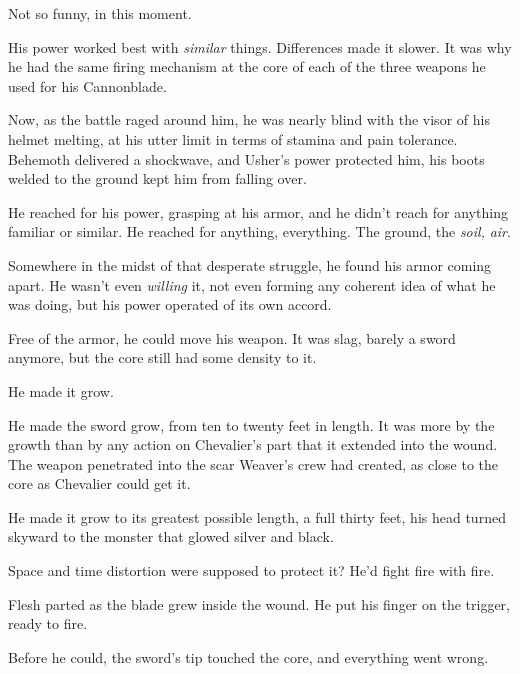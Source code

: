 Not so funny, in this moment.



His power worked best with \emph{similar} things.  Differences made it slower.  It was why he had the same firing mechanism at the core of each of the three weapons he used for his Cannonblade.



Now, as the battle raged around him, he was nearly blind with the visor of his helmet melting, at his utter limit in terms of stamina and pain tolerance.  Behemoth delivered a shockwave, and Usher's power protected him, his boots welded to the ground kept him from falling over.



He reached for his power, grasping at his armor, and he didn't reach for anything familiar or similar.  He reached for anything, everything.  The ground, the \emph{soil, }\emph{air}.



Somewhere in the midst of that desperate struggle, he found his armor coming apart.  He wasn't even \emph{willing} it, not even forming any coherent idea of what he was doing, but his power operated of its own accord.



Free of the armor, he could move his weapon.  It was slag, barely a sword anymore, but the core still had some density to it.



He made it grow.



He made the sword grow, from ten to twenty feet in length.  It was more by the growth than by any action on Chevalier's part that it extended into the wound.  The weapon penetrated into the scar Weaver's crew had created, as close to the core as Chevalier could get it.



He made it grow to its greatest possible length, a full thirty feet, his head turned skyward to the monster that glowed silver and black.



Space and time distortion were supposed to protect it?  He'd fight fire with fire.



Flesh parted as the blade grew inside the wound.  He put his finger on the trigger, ready to fire.



Before he could, the sword's tip touched the core, and everything went wrong.



